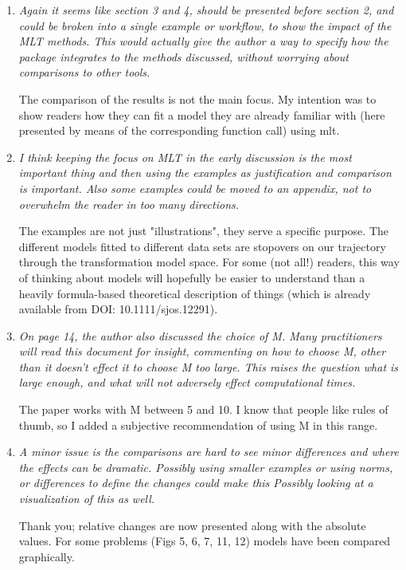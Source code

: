 \documentclass[12pt]{article}
\begin{document}
\begin{enumerate}
\item \textit{Again it seems like section 3 and 4, should be presented
before section 2, and could be broken into a single example or workflow, to
show the impact of the MLT methods.  This would actually give the author a
way to specify how the package integrates to the methods discussed, without
worrying about comparisons to other tools.}

The comparison of the results is not the main focus. My intention was to
show readers how they can fit a model they are already familiar with (here
presented by means of the corresponding function call) using mlt.

\item \textit{I think keeping the focus on MLT
in the early discussion is the most important thing and then using the
examples as justification and comparison is important.  Also some examples
could be moved to an appendix, not to overwhelm the reader in too many
directions.  }

The examples are not just "illustrations", they serve a specific purpose.
The different models fitted to different data sets are stopovers on our
trajectory through the transformation model space. For some (not all!)
readers, this way of thinking about models will hopefully be easier to
understand than a heavily formula-based theoretical description of things
(which is already available from DOI: 10.1111/sjos.12291).

\item \textit{On page 14, the author also discussed the choice of M.  Many
practitioners will read this document for insight, commenting on how to
choose  M, other than it doesn't effect it to choose M too large.  This
raises the question what is large enough, and what will not adversely effect
computational times.  }

The paper works with M between 5 and 10. I know that people like 
rules of thumb, so I added a subjective recommendation of using M in this
range.

\item \textit{A minor issue is the comparisons are hard to see minor
differences and where the effects can be dramatic.  Possibly using smaller
examples or using norms, or differences to define the changes could make
this   Possibly looking at a visualization of this as well.  }

Thank you; relative changes are now presented along with the absolute
values.  For some problems (Figs 5, 6, 7, 11, 12) models have been compared
graphically.


\end{enumerate}
\end{document}
